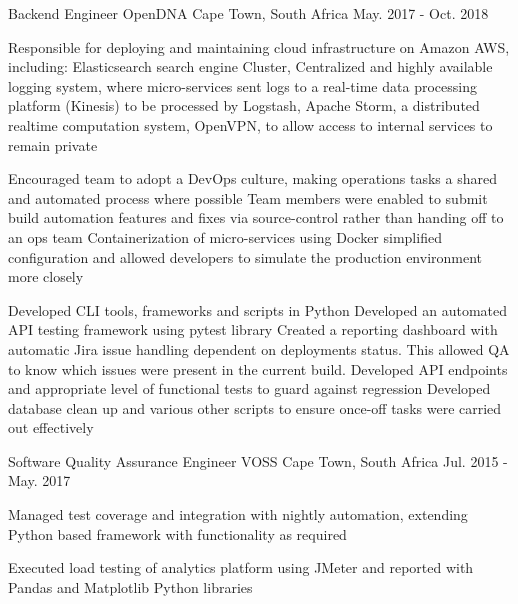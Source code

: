 \begin{cventries}
  \cventry
    {Backend Engineer} %
    {OpenDNA} %
    {Cape Town, South Africa} %
    {May. 2017 - Oct. 2018} %
    {
      \begin{cvitems} %
        \item {Responsible for deploying and maintaining cloud infrastructure on Amazon AWS, including: Elasticsearch search engine Cluster, Centralized and highly available logging system, where micro-services sent logs to a real-time data processing platform (Kinesis) to be
processed by Logstash, Apache Storm, a distributed realtime computation system, OpenVPN, to allow access to internal services to remain private}
        \item {Encouraged team to adopt a DevOps culture, making operations tasks a shared and automated process where possible
Team members were enabled to submit build automation features and fixes via source-control rather than handing off to an ops team
Containerization of micro-services using Docker simplified configuration and allowed developers to simulate the production environment
more closely}
        \item {Developed CLI tools, frameworks and scripts in Python
Developed an automated API testing framework using pytest library
Created a reporting dashboard with automatic Jira issue handling dependent on deployments status. This allowed QA to know which issues
were present in the current build.
Developed API endpoints and appropriate level of functional tests to guard against regression
Developed database clean up and various other scripts to ensure once-off tasks were carried out effectively}
      \end{cvitems}
    }

  \cventry
    {Software Quality Assurance Engineer} %
    {VOSS} %
    {Cape Town, South Africa} %
    {Jul. 2015 - May. 2017} %
    {
      \begin{cvitems} %
        \item {Managed test coverage and integration with nightly automation, extending Python based framework with functionality as required}
        \item {Executed load testing of analytics platform using JMeter and reported with Pandas and Matplotlib Python libraries}
      \end{cvitems}
    }


\end{cventries}
